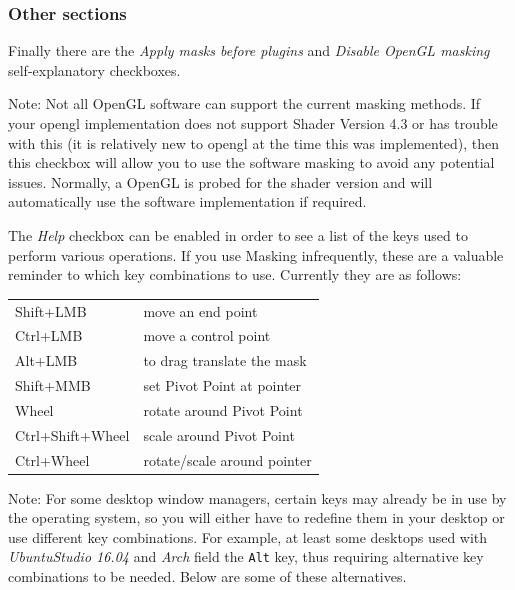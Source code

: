 \subsubsection*{Other sections}%
\label{ssub:other_sections}

Finally there are the \textit{Apply masks before plugins} and \textit{Disable OpenGL masking} self-explanatory checkboxes.

Note: Not all OpenGL software can support the current masking methods.  If your opengl implementation does not support Shader Version 4.3 or has trouble with this (it is relatively new to opengl at the time this was implemented), then this checkbox will allow you to use the software masking to avoid any potential issues.  Normally, a OpenGL is probed for the shader version and will automatically use the software implementation if required.

The \textit{Help} checkbox can be enabled in order to see a list of the keys used to perform various operations.  If you use Masking infrequently, these are a valuable reminder to which key combinations to use.  Currently they are as follows:

\vspace{2ex}
\begin{tabular}{ l  l }
    \hline			
    Shift+LMB & move an end point \\
    Ctrl+LMB & move a control point \\
    Alt+LMB & to drag translate the mask \\
    Shift+MMB & set Pivot Point at pointer \\
    Wheel & rotate around Pivot Point \\
    Ctrl+Shift+Wheel & scale around Pivot Point \\
    Ctrl+Wheel & rotate/scale around pointer \\
    \hline  
\end{tabular}

\vspace{2ex} Note: For some desktop window managers, certain keys may already be in use by the operating system, so you will either have to redefine them in your desktop or use different key combinations.  For example, at least some desktops used with \textit{UbuntuStudio 16.04} and \textit{Arch} field the \texttt{Alt} key, thus requiring alternative key combinations to be needed.  Below are some of these alternatives.

